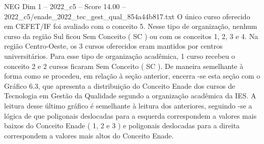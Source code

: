 \begin{textsample}{NEG Dim 1 – 2022\_c5 – Score 14.00 – 2022\_c5/enade\_2022\_tec\_gest\_qual\_854a44b817.txt}
O único curso oferecido em CEFET/IF foi avaliado com o conceito 5.
Nesse tipo de organização, nenhum curso da região Sul ficou Sem Conceito ( SC ) ou com os conceitos 1, 2, 3 e 4.
Na região Centro-Oeste, os 3 cursos oferecidos eram mantidos por centros universitários.
Para esse tipo de organização acadêmica, 1 curso recebeu o conceito 2 e 2 cursos ficaram Sem Conceito ( SC ).
De maneira semelhante à forma como se procedeu, em relação à seção anterior, encerra -se esta seção com o Gráfico 6.3, que apresenta a distribuição do Conceito Enade dos cursos de Tecnologia em Gestão da Qualidade segundo a organização acadêmica da IES.
A leitura desse último gráfico é semelhante à leitura dos anteriores, seguindo -se a lógica de que poligonais deslocadas para a esquerda correspondem a valores mais baixos do Conceito Enade ( 1, 2 e 3 ) e poligonais deslocadas para a direita correspondem a valores mais altos do Conceito Enade.

\end{textsample}
